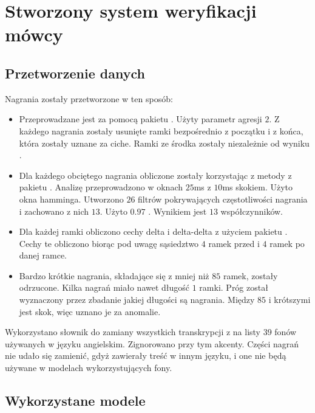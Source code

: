 \chapter{Stworzony system weryfikacji mówcy}\label{chap:badania}

\section{Przetworzenie danych}
\label{sec:data_wrangling}

Nagrania  zostały przetworzone w ten sposób:

\begin{itemize}
    \item Przeprowadzane jest  za pomocą pakietu . Użyty parametr agresji $2$. Z każdego nagrania zostały usunięte ramki bezpośrednio z początku i z końca, która zostały uznane za ciche. Ramki ze środka zostały niezależnie od wyniku .
    \item Dla każdego obciętego nagrania obliczone zostały  korzystając z metody z pakietu . Analizę przeprowadzono w oknach $25$ms z $10$ms skokiem. Użyto okna hamminga. Utworzono $26$ filtrów pokrywających częstotliwości nagrania i zachowano z nich $13$. Użyto $0.97$ . Wynikiem jest $13$ współczynników.
    \item Dla każdej ramki obliczono cechy delta i delta-delta z użyciem pakietu . Cechy
        te obliczono biorąc pod uwagę sąsiedztwo $4$ ramek przed i $4$ ramek po danej ramce.
    \item Bardzo krótkie nagrania, składające się z mniej niż $85$ ramek, zostały odrzucone. Kilka nagrań miało
        nawet długość $1$ ramki. Próg został wyznaczony przez zbadanie jakiej długości są nagrania. Między $85$
        i krótszymi jest skok, więc uznano je za anomalie.
\end{itemize}

Wykorzystano słownik  do zamiany wszystkich transkrypcji z  na listy 39 fonów
używanych w języku angielskim. Zignorowano przy tym akcenty. Części nagrań nie udało się zamienić, gdyż
zawierały treść w innym języku, i one nie będą używane w modelach wykorzystujących fony.

\section{Wykorzystane modele}
\label{sec:data_models}

